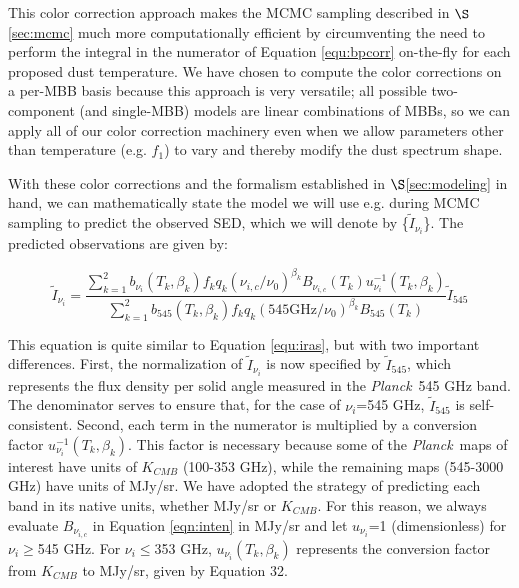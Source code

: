 \documentclass{emulateapj}
\newcommand{\IRAS}{{\it IRAS}}
\newcommand{\PLANCK}{{\it Planck}}
\begin{document}

This color correction approach makes the MCMC sampling described in 
$\S$\ref{sec:mcmc} much more computationally efficient by circumventing the 
need to perform the integral in the numerator of Equation \ref{equ:bpcorr} 
on-the-fly for each proposed dust temperature. We have chosen to compute the 
color corrections on a per-MBB basis because this approach is very 
versatile; all possible two-component (and single-MBB) models are linear 
combinations of MBBs, so we can apply all of our color correction machinery 
even when we allow parameters other than temperature (e.g. $f_1$) to vary and 
thereby modify the dust spectrum shape.


With these color corrections and the  formalism established in 
$\S$\ref{sec:modeling} in hand, we can mathematically state the model we will 
use e.g. during MCMC sampling to predict the observed SED, which we will 
denote by \{$\tilde{I}_{\nu_i}$\}. The predicted observations are given by:

\begin{equation}
\label{eqn:inten}
\tilde{I}_{\nu_i} = \frac{\sum\limits_{k=1}^{2} b_{\nu_i}(T_k, \beta_k) f_k q_k (\nu_{i,c}/\nu_0)^{\beta_k} B_{\nu_{i,c}}(T_k) u_{\nu_i}^{-1}(T_k, \beta_k)}{\sum\limits_{k=1}^{2} b_{545}(T_k, \beta_k) f_k q_k (545 \textrm{GHz}/\nu_0)^{\beta_k} B_{545}(T_k)}\tilde{I}_{545}
\end{equation}

This equation is quite similar to Equation \ref{equ:iras}, but with two 
important differences. First, the normalization of $\tilde{I}_{\nu_i}$ is now 
specified by $\tilde{I}_{545}$, which represents the flux density per solid
angle measured in the \PLANCK~545 GHz band. The denominator serves to ensure 
that, for the case of $\nu_i$=545 GHz, $\tilde{I}_{545}$ is self-consistent. 
Second, each term in the numerator is multiplied by a conversion factor 
$u_{\nu_i}^{-1}(T_k, \beta_k)$. This factor is necessary because some of the 
\PLANCK~maps of interest have units of $K_{CMB}$ (100-353 GHz), while the
remaining maps (545-3000 GHz) have units of MJy/sr. We have adopted the 
strategy of predicting each band in its native units, whether MJy/sr or 
$K_{CMB}$. For this reason, we always evaluate $B_{\nu_{i,c}}$ in Equation 
\ref{eqn:inten} in MJy/sr and let $u_{\nu_i}$=1 (dimensionless) for 
$\nu_i$$\ge$545 GHz. For $\nu_i$$\le$353 GHz, $u_{\nu_i}(T_k, \beta_k)$ 
represents the conversion factor from $K_{CMB}$ to MJy/sr, given by 
\cite{planckresponse} Equation 32.
\end{document}
